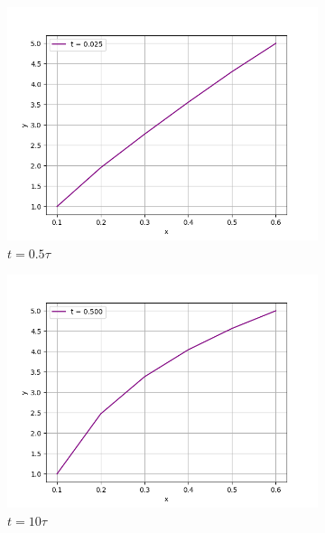 \documentclass[12pt]{article}%
\begin{document}
\begin{figure}[H]
\centering
\begin{subfigure}{0.32\textwidth}
    \includegraphics[width=\textwidth]{implicit-time0.025.png}
    \caption{$t = 0.5 \tau$}
\end{subfigure}
\hfill
\begin{subfigure}{0.32\textwidth}
    \includegraphics[width=\textwidth]{implicit-time0.500.png}
    \caption{$t = 10 \tau$}
\end{subfigure}
\hfill
\begin{subfigure}{0.32\textwidth}

\end{subfigure}
\end{figure}
\end{document}
